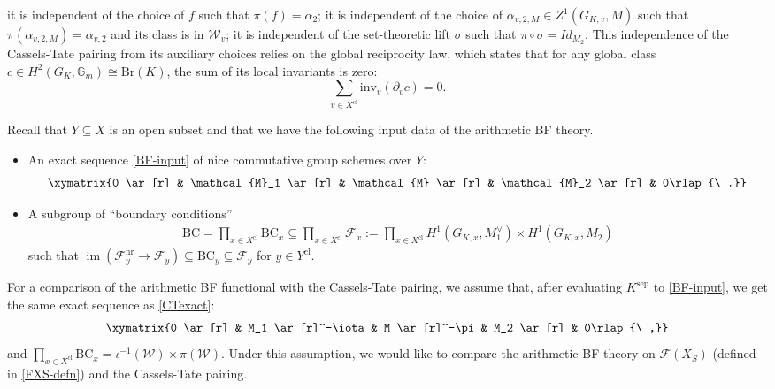 \documentclass[a4paper]{amsart}
\theoremstyle{definition}
\DeclareMathOperator{\im}{im}
\numberwithin{equation}{section}
\begin{document}
it is independent of the choice of $f$ such that $\pi(f) = \alpha_2$;
it is independent of the choice of $\alpha_{v,2,M} \in Z^1(G_{K,v}, M)$ such that $\pi(\alpha_{v,2,M}) = \alpha_{v,2}$ and its class is in $\mathscr{W}_v$;
it is independent of the set-theoretic lift $\sigma$ such that $\pi \circ \sigma =Id_{M_2}$.
This independence of the Cassels-Tate pairing from its auxiliary choices relies on the global reciprocity law, which states that for any global class $c \in H^2(G_K, \mathbb{G}_m) \cong \mathrm{Br}(K)$, the sum of its local invariants is zero:
$$\sum_{v \in X^{\mathrm{cl}}} \mathrm{inv}_v(\partial_v c) = 0.$$







Recall that $Y\subseteq X$ is an open subset and that we have the following input data of the arithmetic BF theory. 
\begin{itemize}
    \item An exact sequence \eqref{BF-input} of nice commutative group schemes over $Y$:
    \begin{align*}
        \xymatrix{0 \ar[r] & \mathcal{M}_1 \ar[r] & \mathcal{M} \ar[r] & \mathcal{M}_2 \ar[r] & 0\rlap{\ .}}
    \end{align*}
    \item A subgroup of ``boundary conditions''
    \begin{align*}
        \mathrm{BC}=\prod_{x\in X^\mathrm{cl}}\mathrm{BC}_x\subseteq\prod_{x\in X^\mathrm{cl}}\mathscr{F}_x:=\prod_{x\in X^\mathrm{cl}}H^1(G_{K,x},M_1^\vee)\times H^1(G_{K,x},M_2)
    \end{align*}
    such that $\im(\mathscr{F}_y^\mathrm{nr}\rightarrow\mathscr{F}_y)\subseteq\mathrm{BC}_y\subseteq\mathscr{F}_y$ for $y\in Y^\mathrm{cl}$.
\end{itemize}
For a comparison of the arithmetic BF functional with the Cassels-Tate pairing, we assume that, after evaluating $K^\mathrm{sep}$ to \eqref{BF-input}, we get the same exact sequence as \eqref{CTexact}:
    \begin{align*}
    \xymatrix{0 \ar[r] & M_1 \ar[r]^-\iota & M \ar[r]^-\pi & M_2 \ar[r] & 0\rlap{\ ,}}
    \end{align*}
and $\displaystyle\prod_{x\in X^\mathrm{cl}}\mathrm{BC}_x=\iota^{-1}(\mathscr{W}) \times\pi(\mathscr{W}).$
Under this assumption, we would like to compare the arithmetic BF theory on $\mathscr{F}(X_S)$ (defined in \eqref{FXS-defn}) and the Cassels-Tate pairing.
\end{document}
